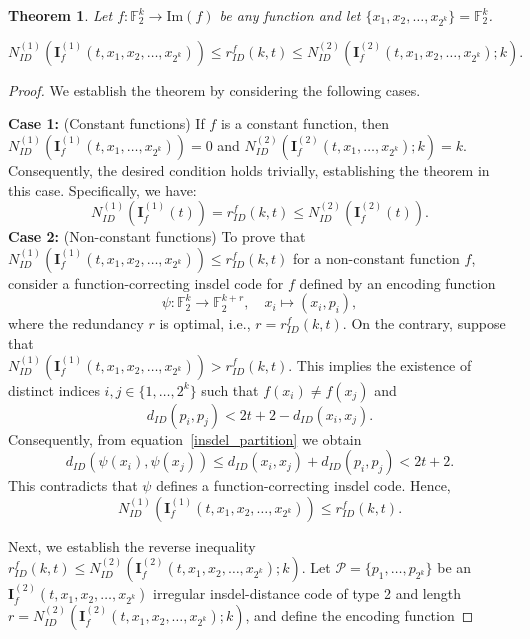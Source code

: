 \documentclass[11 pt]{article}
\numberwithin{equation}{section}
\newtheorem{theorem}{Theorem}[section]
\begin{document}
    \begin{theorem}\label{Theorem_opt_irr}  Let $f: \mathbb{F}_2^k\rightarrow \mathrm{Im}(f)$ be any function and let $\{x_1, x_2, \ldots, x_{2^k}\} = \mathbb{F}_2^k$.  
    
        \[
        N^{(1)}_{ID}(\boldsymbol{I}_f^{(1)}(t,x_1,x_2, \ldots ,x_{2^k})) \leq r_{ID}^f(k,t) \leq N^{(2)}_{ID}(\boldsymbol{I}_f^{(2)}(t,x_1,x_2, \ldots,x_{2^k});k).
        \]   
        
    \end{theorem}
    \begin{proof} We establish the theorem by considering the following cases.
    
        \medskip\noindent\textbf{Case 1: }(Constant functions)
        If \( f \) is a constant function, then \( N^{(1)}_{ID}(\boldsymbol{I}_f^{(1)}(t, x_1, \ldots,x_{2^k}))  = 0 \) and \( N^{(2)}_{ID}(\boldsymbol{I}_f^{(2)}(t, x_1, \ldots, x_{2^k});k)  = k\). Consequently, the desired condition holds trivially, establishing the theorem in this case. Specifically, we have:  
            \[
            N^{(1)}_{ID}(\boldsymbol{I}_f^{(1)}(t)) = r_{ID}^f(k,t) \leq N^{(2)}_{ID}(\boldsymbol{I}_f^{(2)}(t)).
            \]
        \medskip\noindent\textbf{Case 2: }(Non-constant functions)
        To prove that \( N^{(1)}_{ID}(\boldsymbol{I}_f^{(1)}(t, x_1,x_2, \ldots,x_{2^k})) \leq r_{ID}^f(k,t) \) for a non-constant function \( f \), consider a function-correcting insdel code for $f$ defined by an encoding function
        \[
            \psi: \mathbb{F}_2^k \to \mathbb{F}_2^{k+r}, \quad x_i \mapsto (x_i, {p_i}),
         \]
        where the redundancy \( r \) is optimal, i.e.,  \( r = r_{ID}^f(k,t) \). On the contrary, suppose that \\ \( N^{(1)}_{ID}(\boldsymbol{I}_f^{(1)}(t, x_1,x_2, \ldots,x_{2^k})) > r_{ID}^f(k,t) \). This implies the existence of distinct indices \( i,j \in \{1, \ldots, 2^k\} \) such that \( f({x_i}) \neq f({x_j}) \) and  
        \[
        d_{ID}({p_i},{p_j}) < 2t + 2 - d_{ID}({x_i},{x_j}).
        \]
        Consequently,  from equation~\eqref{insdel_partition} we obtain  
        \[
        d_{ID}(\psi({x_i}), \psi({x_j})) \leq d_{ID}({x_i}, {x_j}) + d_{ID}({p_i}, {p_j})  < 2t + 2.
        \]
        This contradicts that $\psi$ defines a function-correcting insdel code. Hence, 
        \[
        N^{(1)}_{ID}(\boldsymbol{I}_f^{(1)}(t, x_1,x_2, \ldots,x_{2^k})) \leq r_{ID}^f(k,t).
        \]
        \begin{sloppypar}
        Next, we establish the reverse inequality \( r_{ID}^f(k,t) \leq N^{(2)}_{ID}(\boldsymbol{I}_f^{(2)}(t, x_1,x_2, \ldots,x_{2^k});k) \). Let $\mathcal{P} = \{{p_1}, \ldots, {p_{2^k}}\}$ be an \(\boldsymbol{I}_f^{(2)}(t, x_1,x_2, \ldots,x_{2^k}) \) irregular insdel-distance code of type 2 and length \( r = N^{(2)}_{ID} (\boldsymbol{I}_f^{(2)}(t,  x_1,x_2, \ldots,x_{2^k});k) \), and define the encoding function  

\end{sloppypar}
\end{proof}
\end{document}
